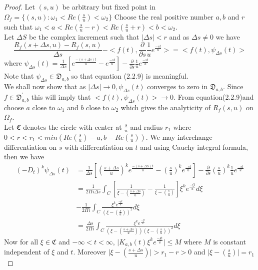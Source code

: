 \begin{proof}
 Let $(s,u)$ be arbitrary but fixed point in $\Omega_{f}=\lbrace(s,u):\omega_{1}<Re(\frac{s}{u})<\omega_{2}\rbrace$ Choose the real positive number $a,b$ and $r$ such that $\omega_{1}<a<Re(\frac{s}{u}-r)<Re(\frac{s}{u}+r)<b<\omega_{2}$.\\
Let $\Delta{S}$ be the complex increment such that $ \vert\Delta{s}\vert<r $ and as $ \Delta{s}\neq 0 $ we have
\begin{equation}
\frac{ R_{f}(s+\Delta{s},u)-R_{f}(s,u)}{\Delta{s}}-<f(t),\frac{\partial}{\partial{s}}\frac{1}{u}e^{\frac{-st}{u}}>=<f(t),\psi_{\Delta{s}}(t)>
\end{equation}
where $ \psi_{\Delta{s}}(t)=\frac{1}{\Delta{s}}[e^{\frac{-(s+\Delta{s})t}{u}}-e^{\frac{-st}{u}}]-\frac{\partial}{\partial{s}}\frac{1}{u}e^{\frac{-st}{u}}$\\
Note that $\psi_{\Delta{s}}\in \mathfrak{D}_{a,b}$ so that equation (2.2.9) is meaningful.\\
We shall now show that as $\vert\Delta{s}\vert\rightarrow 0,\psi_{\Delta{s}}(t)$ converges to zero in $\mathfrak{D}_{a,b}$. Since $ f\in \mathfrak{D}_{a,b}^{'} $ this will imply that $ <f(t),\psi_{\Delta{s}}(t)>\rightarrow 0 $. From equation(2.2.9)and choose $a$ close to $\omega_{1}$ and $b$ close to $\omega_{2}$ which gives the analyticity of $R_{f}(s,u)$ on $\Omega_{f}$.\\
Let $\mathfrak{C}$ denotes the circle with center at $\frac{s}{u}$ and radius $r_{1}$ where $ 0<r<r_{1}<min(Re(\frac{s}{u})-a,b-Re(\frac{s}{u}))$. We may interchange differentiation on $s$ with differentiation on $t$ and using Cauchy integral formula, then we have
\begin{align*}
(-D_{t})^{k}\psi_{\Delta{s}}(t)&=\frac{1}{\Delta{s}}[(\frac{s+\Delta{s}}{u})^{k}e^{\frac{-(s+\Delta{S})t}{u}}-(\frac{s}{u})^{k}e^{\frac{-st}{u}}]-\frac{\partial}{\partial{s}}(\frac{s}{u})^{k}\frac{1}{u}e^{\frac{-st}{u}}\\
&= \frac{1}{2\Pi i\Delta{s}}\int_{C}[\frac{1}{\xi-(\frac{s+\Delta{s}}{u})}-\frac{1}{\xi-(\frac{s}{u})}]\xi^{k}e^{\frac{-\xi t}{u}}d\xi\\
&-\frac{1}{2\Pi i}\int_{C}\frac{\xi^{k}e^{\frac{-\xi t}{u}}}{(\xi-(\frac{s}{u}))^{2}}d\xi\\
&=\frac{\Delta{s}}{2\Pi i}\int_{C}\frac{\xi^{k}e^{\frac{-\xi t}{u}}}{(\xi-(\frac{s+\Delta{s}}{u}))(\xi-(\frac{s}{u}))^{2}}d\xi
\end{align*}
Now for all $\xi\in \mathfrak{C} $ and $-\infty<t<\infty$,
$\vert K_{a,b}(t)\xi^{k}e^{\frac{-\xi t}{u}}\vert\leq M$ where $M$ is constant independent of $\xi$ and $t$. Moreover $\vert\xi-(\frac{s+\Delta{s}}{u})\vert>r_{1}-r>0$ and $\vert\xi-(\frac{s}{u})\vert =r_{1}$

\end{proof}
